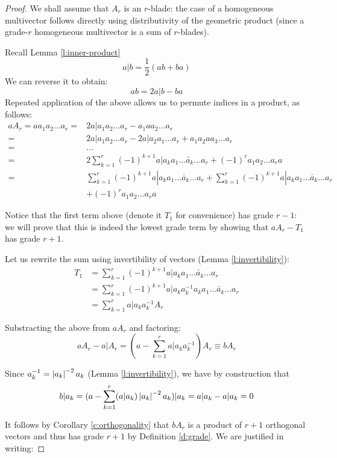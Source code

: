 \begin{proof}
	We shall assume that $A_r$ is an $r$-blade: the case of a homogeneous multivector follows directly using distributivity of the geometric product (since a grade-$r$ homogeneous multivector is a sum of $r$-blades).

	Recall Lemma \ref{l:inner-product} 
	\[a | b = \frac{1}{2}(ab + ba)\]
	We can reverse it to obtain:
	\[ab = 2 a | b - ba\]
	Repeated application of the above allows us to permute indices in a product, as follows:
	\begin{align*}
		aA_r = aa_1a_2 \ldots a_r = &2a|a_1a_2 \ldots a_r - a_1aa_2 \ldots a_r \\
		= &2a|a_1a_2 \ldots a_r - 2a|a_2a_1 \ldots a_r + a_1a_2aa_3 \ldots a_r \\
		= &\ldots \\
		= &2 \sum_{k=1}^r (-1)^{k+1}a|a_k a_1 \ldots \check{a_k} \ldots a_r + (-1)^ra_1a_2 \ldots a_ra \\
		= &\sum_{k=1}^r (-1)^{k+1}a|a_k a_1 \ldots \check{a_k} \ldots a_r + \sum_{k=1}^r (-1)^{k+1}a|a_k a_1 \ldots \check{a_k} \ldots a_r \\
		&+ (-1)^ra_1a_2 \ldots a_ra
	\end{align*}

	Notice that the first term above (denote it $T_1$ for convenience) has grade $r-1$: we will prove that this is indeed the lowest grade term by showing that $aA_r - T_1$ has grade $r+1$.
	
	Let us rewrite the sum using invertibility of vectors (Lemma \ref{l:invertibility}):
	\begin{align*}
		T_1 &= \sum_{k=1}^r (-1)^{k+1}a|a_k a_1 \ldots \check{a_k} \ldots a_r\\
				&= \sum_{k=1}^r (-1)^{k+1}a|a_k a_k^{-1}a_k a_1 \ldots \check{a_k} \ldots a_r\\
				&= \sum_{k=1}^r a|a_k a_k^{-1} A_r 
	\end{align*}

	Substracting the above from $aA_r$ and factoring:
	\[aA_r - a | A_r = (a - \sum_{k=1}^r a|a_k a_k^{-1})A_r \equiv bA_r\]
	
	Since $a_k^{-1} = \left|a_k\right|^{-2}a_k$ (Lemma \ref{l:invertibility}), we have by construction that
	\[b | a_k = (a - \sum_{k=1}^r (a|a_k) \left|a_k\right|^{-2}a_k)|a_k = a|a_k - a|a_k  = 0 \]

	It follows by Corollary \ref{c:orthogonality} that $bA_r$ is a product of $r+1$ orthogonal vectors and thus has grade $r+1$ by Definition \ref{d:grade}. We are justified in writing:


\end{proof}

